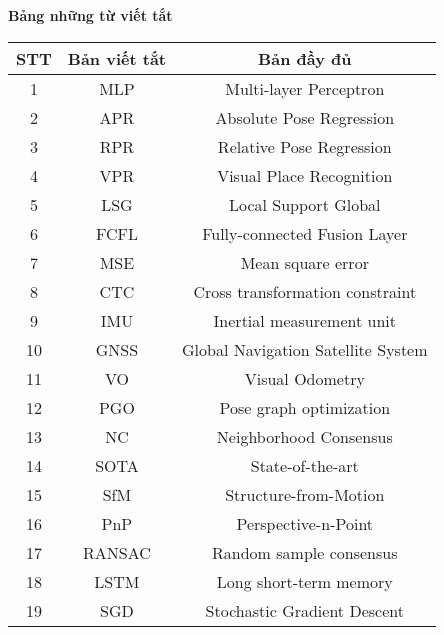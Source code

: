 \titlepage \null
	\small
	\begin{center}
	  {\bfseries Bảng những từ viết tắt\vspace{-.5em}}
	\end{center}
	\quotation
\begin{table}[h]
\centering
\begin{tabular}{|c|c|c|}
\hline
\textbf{STT} & \textbf{Bản viết tắt}                & \textbf{Bản đầy đủ}     \\ \hline
1            & MLP                  & Multi-layer Perceptron        \\ \hline
2            & APR                  & Absolute Pose Regression      \\ \hline
3            & RPR                  & Relative Pose Regression      \\ \hline
4            & VPR                  & Visual Place Recognition      \\ \hline
5            & LSG                  & Local Support Global          \\ \hline
6            & FCFL                 & Fully-connected Fusion Layer  \\ \hline
7            & MSE                  & Mean square error             \\ \hline
8            & CTC                  & Cross transformation constraint \\ \hline
9		& IMU		& Inertial measurement unit	\\ \hline
10		& GNSS		& Global Navigation Satellite System \\ \hline
11		& VO			& Visual Odometry	\\ \hline
12      & PGO       & Pose graph optimization   \\ \hline
13	 & NC 	 & Neighborhood Consensus	\\ \hline
14 		& SOTA		& State-of-the-art \\ \hline
15		& SfM 		& Structure-from-Motion \\ \hline
16		& PnP		& Perspective-n-Point \\ \hline
17 		& RANSAC	& Random sample consensus \\ \hline
18		& LSTM		& Long short-term memory \\ \hline
19 		& SGD		& Stochastic Gradient Descent \\ \hline
\end{tabular}
\end{table}

